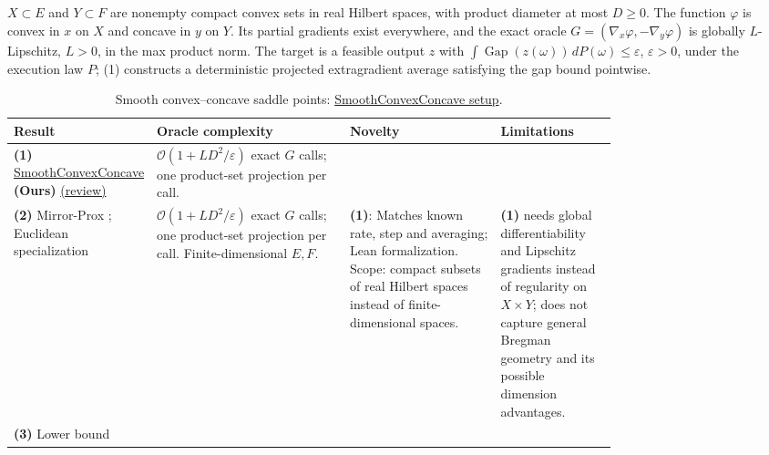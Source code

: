 \begin{table}[tp]
\centering
\caption{Smooth convex--concave saddle points: \href{https://github.com/k3nfalt/longtails/blob/main/LongTails/Setups/SmoothConvexConcave.lean}{SmoothConvexConcave setup}.}\label{tab:SmoothConvexConcave}
\parbox{\linewidth}{\footnotesize $X\subset E$ and $Y\subset F$ are nonempty compact convex sets in real Hilbert spaces, with product diameter at most $D\ge0$. The function $\varphi$ is convex in $x$ on $X$ and concave in $y$ on $Y$. Its partial gradients exist everywhere, and the exact oracle $G=(\nabla_x\varphi,-\nabla_y\varphi)$ is globally $L$-Lipschitz, $L>0$, in the max product norm. The target is a feasible output $z$ with $\int \operatorname{Gap}(z(\omega))\,dP(\omega)\le\varepsilon$, $\varepsilon>0$, under the execution law $P$; (1) constructs a deterministic projected extragradient average satisfying the gap bound pointwise.}\par\smallskip
\begin{threeparttable}
\footnotesize
\setlength{\tabcolsep}{4pt}\renewcommand{\arraystretch}{1.25}
\begin{tabularx}{\linewidth}{@{}>{\raggedright\arraybackslash}p{0.20\linewidth}>{\raggedright\arraybackslash}p{0.32\linewidth}>{\raggedright\arraybackslash}p{0.25\linewidth}>{\raggedright\arraybackslash}X@{}}
\toprule
\textbf{Result} & \textbf{Oracle complexity} & \textbf{Novelty} & \textbf{Limitations} \\
\midrule
\textbf{(1)} \href{https://github.com/k3nfalt/longtails/blob/main/LongTails/Theorems/SmoothConvexConcave.lean}{Smooth\allowbreak Convex\allowbreak Concave} \textbf{(Ours)} \href{https://github.com/k3nfalt/longtails/blob/main/scripts/reviews/SmoothConvexConcave.md}{(review)}
& $\mathcal{O}(1+LD^2/\varepsilon)$ exact $G$ calls; one product-set projection per call. & & \\
\midrule[1.2pt]
\textbf{(2)} Mirror-Prox \citep[Theorem 3.2]{sccNemirovski2004}; Euclidean specialization
& $\mathcal{O}(1+LD^2/\varepsilon)$ exact $G$ calls; one product-set projection per call. Finite-dimensional $E,F$.
& \textbf{(1)}: Matches known rate, step and averaging; Lean formalization. Scope: compact subsets of real Hilbert spaces instead of finite-dimensional spaces.
& \textbf{(1)} needs global differentiability and Lipschitz gradients instead of regularity on $X\times Y$; does not capture general Bregman geometry and its possible dimension advantages. \\
\midrule
\textbf{(3)} Lower bound \citep[Theorem 9, v1]{sccOuyangXu2018v1}

\end{tabularx}
\end{threeparttable}
\end{table}
